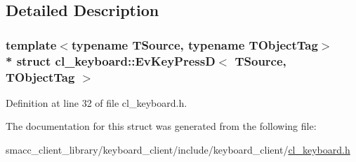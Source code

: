 \subsection{Detailed Description}
\subsubsection*{template$<$typename T\+Source, typename T\+Object\+Tag$>$\\*
struct cl\+\_\+keyboard\+::\+Ev\+Key\+Press\+D$<$ T\+Source, T\+Object\+Tag $>$}



Definition at line 32 of file cl\+\_\+keyboard.\+h.



The documentation for this struct was generated from the following file\+:\begin{DoxyCompactItemize}
\item 
smacc\+\_\+client\+\_\+library/keyboard\+\_\+client/include/keyboard\+\_\+client/\hyperlink{cl__keyboard_8h}{cl\+\_\+keyboard.\+h}\end{DoxyCompactItemize}
